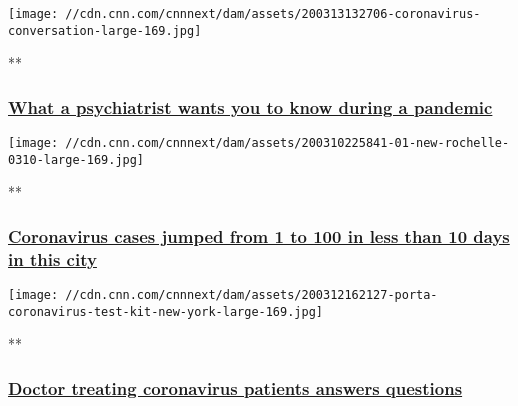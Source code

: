 \href{/videos/us/2020/03/13/coronavirus-response-national-emergency-mental-health-acfc-full-episode-vpx.cnn/video/playlists/acfc-full-episodes/}{}

\texttt{[image: //cdn.cnn.com/cnnnext/dam/assets/200313132706-coronavirus-conversation-large-169.jpg]}

**

\hypertarget{what-a-psychiatrist-wants-you-to-know-during-a-pandemic}{%
\subsubsection{\texorpdfstring{\href{/videos/us/2020/03/13/coronavirus-response-national-emergency-mental-health-acfc-full-episode-vpx.cnn/video/playlists/acfc-full-episodes/}{What
a psychiatrist wants you to know during a
pandemic}}{What a psychiatrist wants you to know during a pandemic}}\label{what-a-psychiatrist-wants-you-to-know-during-a-pandemic}}

\href{/videos/us/2020/03/11/new-rochelle-coronavirus-questions-acfc-full-episode-vpx.cnn/video/playlists/acfc-full-episodes/}{}

\texttt{[image: //cdn.cnn.com/cnnnext/dam/assets/200310225841-01-new-rochelle-0310-large-169.jpg]}

**

\hypertarget{coronavirus-cases-jumped-from-1-to-100-in-less-than-10-days-in-this-city}{%
\subsubsection{\texorpdfstring{\href{/videos/us/2020/03/11/new-rochelle-coronavirus-questions-acfc-full-episode-vpx.cnn/video/playlists/acfc-full-episodes/}{Coronavirus
cases jumped from 1 to 100 in less than 10 days in this
city}}{Coronavirus cases jumped from 1 to 100 in less than 10 days in this city}}\label{coronavirus-cases-jumped-from-1-to-100-in-less-than-10-days-in-this-city}}

\href{/videos/us/2020/03/12/coronavirus-questions-dr-fink-acfc-full-episode-vpx.cnn/video/playlists/acfc-full-episodes/}{}

\texttt{[image: //cdn.cnn.com/cnnnext/dam/assets/200312162127-porta-coronavirus-test-kit-new-york-large-169.jpg]}

**

\hypertarget{doctor-treating-coronavirus-patients-answers-questions}{%
\subsubsection{\texorpdfstring{\href{/videos/us/2020/03/12/coronavirus-questions-dr-fink-acfc-full-episode-vpx.cnn/video/playlists/acfc-full-episodes/}{Doctor
treating coronavirus patients answers
questions}}{Doctor treating coronavirus patients answers questions}}\label{doctor-treating-coronavirus-patients-answers-questions}}

